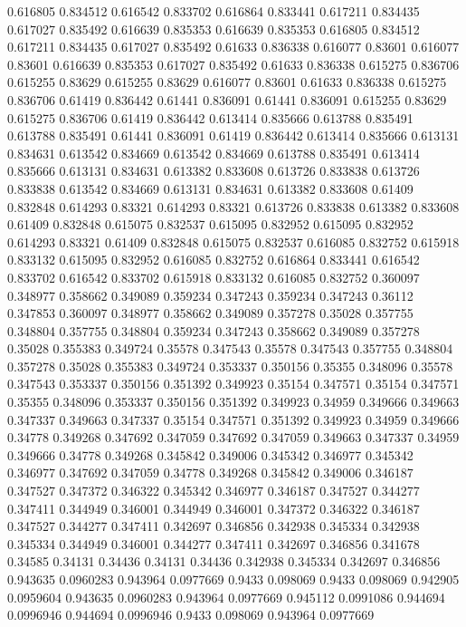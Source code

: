 0.616805 0.834512
0.616542 0.833702
0.616864 0.833441
0.617211 0.834435
0.617027 0.835492
0.616639 0.835353
0.616639 0.835353
0.616805 0.834512
0.617211 0.834435
0.617027 0.835492
0.61633 0.836338
0.616077 0.83601
0.616077 0.83601
0.616639 0.835353
0.617027 0.835492
0.61633 0.836338
0.615275 0.836706
0.615255 0.83629
0.615255 0.83629
0.616077 0.83601
0.61633 0.836338
0.615275 0.836706
0.61419 0.836442
0.61441 0.836091
0.61441 0.836091
0.615255 0.83629
0.615275 0.836706
0.61419 0.836442
0.613414 0.835666
0.613788 0.835491
0.613788 0.835491
0.61441 0.836091
0.61419 0.836442
0.613414 0.835666
0.613131 0.834631
0.613542 0.834669
0.613542 0.834669
0.613788 0.835491
0.613414 0.835666
0.613131 0.834631
0.613382 0.833608
0.613726 0.833838
0.613726 0.833838
0.613542 0.834669
0.613131 0.834631
0.613382 0.833608
0.61409 0.832848
0.614293 0.83321
0.614293 0.83321
0.613726 0.833838
0.613382 0.833608
0.61409 0.832848
0.615075 0.832537
0.615095 0.832952
0.615095 0.832952
0.614293 0.83321
0.61409 0.832848
0.615075 0.832537
0.616085 0.832752
0.615918 0.833132
0.615095 0.832952
0.616085 0.832752
0.616864 0.833441
0.616542 0.833702
0.616542 0.833702
0.615918 0.833132
0.616085 0.832752
0.360097 0.348977
0.358662 0.349089
0.359234 0.347243
0.359234 0.347243
0.36112 0.347853
0.360097 0.348977
0.358662 0.349089
0.357278 0.35028
0.357755 0.348804
0.357755 0.348804
0.359234 0.347243
0.358662 0.349089
0.357278 0.35028
0.355383 0.349724
0.35578 0.347543
0.35578 0.347543
0.357755 0.348804
0.357278 0.35028
0.355383 0.349724
0.353337 0.350156
0.35355 0.348096
0.35578 0.347543
0.353337 0.350156
0.351392 0.349923
0.35154 0.347571
0.35154 0.347571
0.35355 0.348096
0.353337 0.350156
0.351392 0.349923
0.34959 0.349666
0.349663 0.347337
0.349663 0.347337
0.35154 0.347571
0.351392 0.349923
0.34959 0.349666
0.34778 0.349268
0.347692 0.347059
0.347692 0.347059
0.349663 0.347337
0.34959 0.349666
0.34778 0.349268
0.345842 0.349006
0.345342 0.346977
0.345342 0.346977
0.347692 0.347059
0.34778 0.349268
0.345842 0.349006
0.346187 0.347527
0.347372 0.346322
0.345342 0.346977
0.346187 0.347527
0.344277 0.347411
0.344949 0.346001
0.344949 0.346001
0.347372 0.346322
0.346187 0.347527
0.344277 0.347411
0.342697 0.346856
0.342938 0.345334
0.342938 0.345334
0.344949 0.346001
0.344277 0.347411
0.342697 0.346856
0.341678 0.34585
0.34131 0.34436
0.34131 0.34436
0.342938 0.345334
0.342697 0.346856
0.943635 0.0960283
0.943964 0.0977669
0.9433 0.098069
0.9433 0.098069
0.942905 0.0959604
0.943635 0.0960283
0.943964 0.0977669
0.945112 0.0991086
0.944694 0.0996946
0.944694 0.0996946
0.9433 0.098069
0.943964 0.0977669
